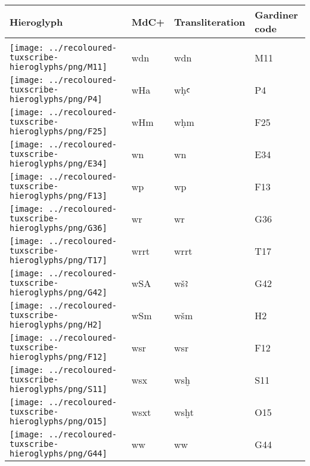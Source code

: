 \begin{center}
	\begin{tabularx}{\linewidth}{YYYY}
		Hieroglyph & MdC+ & Transliteration & Gardiner code\\
		\hline\\
		\texttt{[image: ../recoloured-tuxscribe-hieroglyphs/png/M11]} & wdn & wdn & M11 \\ 
		\texttt{[image: ../recoloured-tuxscribe-hieroglyphs/png/P4]} & wHa & wḥꜥ & P4 \\ 
		\texttt{[image: ../recoloured-tuxscribe-hieroglyphs/png/F25]} & wHm & wḥm & F25 \\ 
		\texttt{[image: ../recoloured-tuxscribe-hieroglyphs/png/E34]} & wn & wn & E34 \\ 
		\texttt{[image: ../recoloured-tuxscribe-hieroglyphs/png/F13]} & wp & wp & F13 \\ 
		\texttt{[image: ../recoloured-tuxscribe-hieroglyphs/png/G36]} & wr & wr & G36 \\ 
		\texttt{[image: ../recoloured-tuxscribe-hieroglyphs/png/T17]} & wrrt & wrrt & T17 \\ 
		\texttt{[image: ../recoloured-tuxscribe-hieroglyphs/png/G42]} & wSA & wšꜣ & G42 \\ 
		\texttt{[image: ../recoloured-tuxscribe-hieroglyphs/png/H2]} & wSm & wšm & H2 \\ 
		\texttt{[image: ../recoloured-tuxscribe-hieroglyphs/png/F12]} & wsr & wsr & F12 \\ 
		\texttt{[image: ../recoloured-tuxscribe-hieroglyphs/png/S11]} & wsx & wsḫ & S11 \\ 
		\texttt{[image: ../recoloured-tuxscribe-hieroglyphs/png/O15]} & wsxt & wsḫt & O15 \\ 
		\texttt{[image: ../recoloured-tuxscribe-hieroglyphs/png/G44]} & ww & ww & G44 \\ 
	\end{tabularx}
\end{center}


